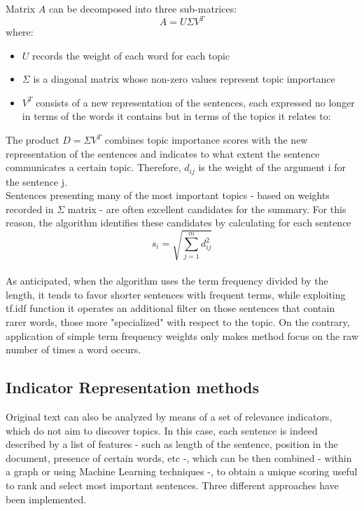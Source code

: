 \documentclass[fleqn,10pt]{SelfArx} %
\begin{document}
Matrix $A$ can be decomposed into three sub-matrices:
$$A=U\Sigma V^T$$
where:
\begin{itemize}
    \item $U$ records the weight of each word for each topic
    \item $\Sigma$ is a diagonal matrix whose non-zero values represent topic importance
    \item $V^T$ consists of a new representation of the sentences, each expressed no longer in terms of the words it contains but in terms of the topics it relates to:
\end{itemize}
The product $D=\Sigma V^T$ combines topic importance scores with the new representation of the sentences and indicates to what extent the sentence communicates a certain topic. Therefore, $d_{ij}$ is the weight of the argument i for the sentence j.\\
Sentences presenting many of the most important topics - based on weights recorded in $\Sigma$ matrix - are often excellent candidates for the summary. For this reason, the algorithm identifies these candidates by calculating for each sentence  $$s_i=\sqrt{\sum_{j=1}^md^2_{ij}}$$
\\
As anticipated, when the algorithm uses the term frequency divided by the length, it tends to favor shorter sentences with frequent terms, while exploiting tf.idf function it operates an additional filter on those sentences that contain rarer words, those more "specialized" with respect to the topic. On the contrary, application of simple term frequency weights only makes method focus on the raw number of times a word occurs.
\subsection{Indicator Representation methods}
Original text can also be analyzed by means of a set of relevance indicators, which do not aim to discover topics. In this case, each sentence is indeed described by a list of features - such as length of the sentence, position in the document, presence of certain words, etc -, which can be then combined - within a graph or using Machine Learning techniques -, to obtain a unique scoring useful to rank and select most important sentences. Three different approaches have been implemented.
\end{document}
